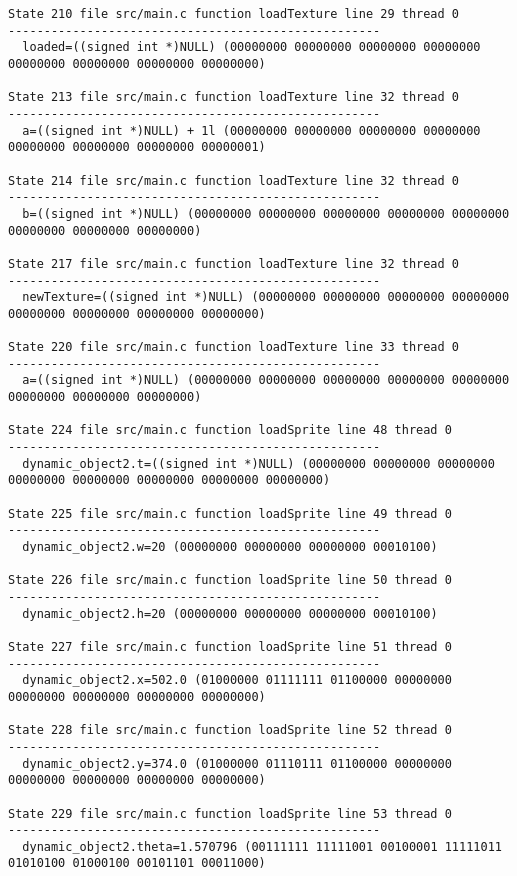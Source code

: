 \begin{verbatim}
State 210 file src/main.c function loadTexture line 29 thread 0
----------------------------------------------------
  loaded=((signed int *)NULL) (00000000 00000000 00000000 00000000 00000000 00000000 00000000 00000000)

State 213 file src/main.c function loadTexture line 32 thread 0
----------------------------------------------------
  a=((signed int *)NULL) + 1l (00000000 00000000 00000000 00000000 00000000 00000000 00000000 00000001)

State 214 file src/main.c function loadTexture line 32 thread 0
----------------------------------------------------
  b=((signed int *)NULL) (00000000 00000000 00000000 00000000 00000000 00000000 00000000 00000000)

State 217 file src/main.c function loadTexture line 32 thread 0
----------------------------------------------------
  newTexture=((signed int *)NULL) (00000000 00000000 00000000 00000000 00000000 00000000 00000000 00000000)

State 220 file src/main.c function loadTexture line 33 thread 0
----------------------------------------------------
  a=((signed int *)NULL) (00000000 00000000 00000000 00000000 00000000 00000000 00000000 00000000)

State 224 file src/main.c function loadSprite line 48 thread 0
----------------------------------------------------
  dynamic_object2.t=((signed int *)NULL) (00000000 00000000 00000000 00000000 00000000 00000000 00000000 00000000)

State 225 file src/main.c function loadSprite line 49 thread 0
----------------------------------------------------
  dynamic_object2.w=20 (00000000 00000000 00000000 00010100)

State 226 file src/main.c function loadSprite line 50 thread 0
----------------------------------------------------
  dynamic_object2.h=20 (00000000 00000000 00000000 00010100)

State 227 file src/main.c function loadSprite line 51 thread 0
----------------------------------------------------
  dynamic_object2.x=502.0 (01000000 01111111 01100000 00000000 00000000 00000000 00000000 00000000)

State 228 file src/main.c function loadSprite line 52 thread 0
----------------------------------------------------
  dynamic_object2.y=374.0 (01000000 01110111 01100000 00000000 00000000 00000000 00000000 00000000)

State 229 file src/main.c function loadSprite line 53 thread 0
----------------------------------------------------
  dynamic_object2.theta=1.570796 (00111111 11111001 00100001 11111011 01010100 01000100 00101101 00011000)


\end{verbatim}

